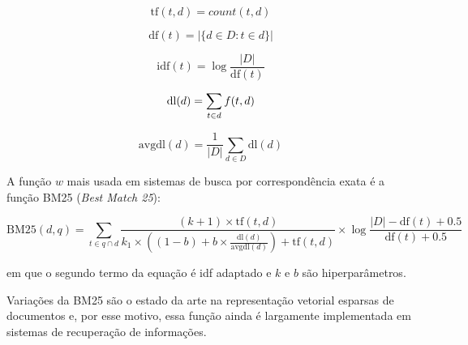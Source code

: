 \documentclass[
	12pt,				%
	openright,			%
	oneside,			%
	a4paper,			%
	english,			%
	french,				%
	spanish,			%
	brazil				%
	]{abntex2}
\begin{document}
\begin{equation}
\text{tf}(t, d) = count(t, d)
\label{eq:tf}
\end{equation}

\begin{equation}
\text{df}(t) = \left| \{ d \in D : t \in d \} \right|
\label{eq:df}
\end{equation}

\begin{equation}
\text{idf}(t) = \log \frac{|D|}{\text{df}(t)}
\label{eq:idf}
\end{equation}

\begin{equation}
\text{dl}(d) = \sum_{t \in d} f(t,d) \\
\label{eq:dl}
\end{equation}

\begin{equation}
\text{avgdl}(d) = \frac{1}{|D|} \sum_{d \in D} \text{dl}(d)
\label{eq:}
\end{equation}


A função $w$ mais usada em sistemas de busca por correspondência exata é a função BM25 (\textit{Best Match 25}): \cite{}

\begin{equation}
\text{BM25}(d,q) = \sum_{t \in q \cap d} \frac{(k + 1) \times \text{tf}(t,d)}{k_1 \times ((1-b) + b \times \frac{\text{dl}(d)}{\text{avgdl}(d)}) + \text{tf}(t,d)} \times \log \frac{|D| - \text{df}(t) + 0.5}{\text{df}(t) + 0.5}
\end{equation}

em que o segundo termo da equação é idf adaptado e $k$ e $b$ são hiperparâmetros.

Variações da BM25 são o estado da arte na representação vetorial esparsas de documentos e, por esse motivo, essa função ainda é largamente implementada em sistemas de recuperação de informações. \cite{}
\end{document}
